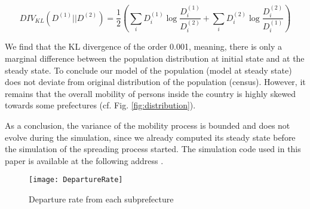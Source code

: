 \documentclass[review]{elsarticle}
\begin{document}
$$DIV_{KL}\left(D^{(1)}||D^{(2)}\right)= \frac{1}{2} \left(\sum_{i} D_i^{(1)}  \log \frac{D_i^{(1)}}{D_i^{(2)}} + \sum_{i} D_i^{(2)} \log⁡ \frac{D_i^{(2)}}{D_i^{(1)}} \right)$$

We find that the KL divergence of the order 0.001, meaning, there is only a marginal difference between the population distribution at initial state and at the steady state. To conclude our model of the population (model at steady state) does not deviate from original distribution of the population (census). However, it remains that the overall mobility of persons inside the country is highly skewed towards some prefectures (cf. Fig. \ref{fig:distribution}).

As a conclusion, the variance of the mobility process is bounded and does not evolve during the simulation, since we already computed its steady state before the simulation of the spreading process started. The simulation code used in this paper is available at the following address \cite{code}.

\begin{figure*}
    \centering
    \texttt{[image: DepartureRate]}
    \caption{Departure rate from each subprefecture}
    \label{fig:departurerate}
\end{figure*}


\end{document}
